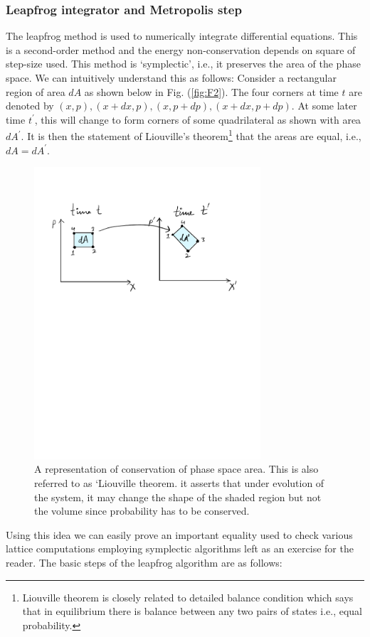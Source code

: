 \documentclass[11pt]{article}
\begin{document}
\subsubsection{Leapfrog integrator and Metropolis step}

The leapfrog method is used to numerically integrate differential equations. This is a second-order method and the energy non-conservation depends on square of step-size used. This method is `symplectic', i.e., it preserves the area of the phase space. 
We can intuitively understand this as follows: 
Consider a rectangular region of area $dA$ as shown below in Fig. (\ref{fig:F2}). The four corners at time $t$ are denoted by $(x, p), (x + dx, p), (x, p + dp), (x + dx, p + dp)$. At some later time $t^{\prime}$, this will change to form corners of some quadrilateral 
as shown with area $dA^{\prime}$. It is then the statement of Liouville's theorem\footnote{Liouville theorem is closely related to detailed balance condition which says that in equilibrium there is balance between any two pairs of states i.e., equal probability.} that the areas are equal, i.e., $dA = dA^{\prime}$. 
\begin{figure}[htbp] 
	\centering 
	\includegraphics[width=0.75\textwidth]{figs/PSP.pdf}
	\caption{\label{fig:F1}A representation of conservation of phase space area. This is also referred to as `Liouville theorem. it asserts that under evolution of the system, it may change the shape of the shaded region but not the volume since probability has to be conserved. }
\end{figure}
Using this idea we can easily prove an important equality used to check various lattice computations employing symplectic algorithms
left as an exercise for the reader. The basic steps of the leapfrog algorithm are as follows:
\end{document}

